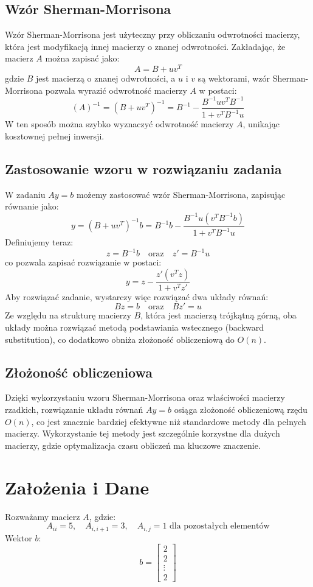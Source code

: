 \documentclass[a4paper,12pt]{article}
\begin{document}
\subsection{Wzór Sherman-Morrisona}
Wzór Sherman-Morrisona jest użyteczny przy obliczaniu odwrotności macierzy, która jest modyfikacją innej macierzy o znanej odwrotności. Zakładając, że macierz \( A \) można zapisać jako:
\[
A = B + uv^T
\]
gdzie \( B \) jest macierzą o znanej odwrotności, a \( u \) i \( v \) są wektorami, wzór Sherman-Morrisona pozwala wyrazić odwrotność macierzy \( A \) w postaci:
\[
(A)^{-1} = (B + uv^T)^{-1} = B^{-1} - \frac{B^{-1} u v^T B^{-1}}{1 + v^T B^{-1} u}
\]
W ten sposób można szybko wyznaczyć odwrotność macierzy \( A \), unikając kosztownej pełnej inwersji.

\subsection{Zastosowanie wzoru w rozwiązaniu zadania}
W zadaniu \( Ay = b \) możemy zastosować wzór Sherman-Morrisona, zapisując równanie jako:
\[
y = (B + uv^T)^{-1} b = B^{-1}b - \frac{B^{-1} u (v^T B^{-1} b)}{1 + v^T B^{-1} u}
\]
Definiujemy teraz:
\[
z = B^{-1} b \quad \text{oraz} \quad z' = B^{-1} u
\]
co pozwala zapisać rozwiązanie w postaci:
\[
y = z - \frac{z' (v^T z)}{1 + v^T z'}
\]
Aby rozwiązać zadanie, wystarczy więc rozwiązać dwa układy równań:
\[
B z = b \quad \text{oraz} \quad B z' = u
\]
Ze względu na strukturę macierzy \( B \), która jest macierzą trójkątną górną, oba układy można rozwiązać metodą podstawiania wstecznego (backward substitution), co dodatkowo obniża złożoność obliczeniową do \( O(n) \).

\subsection{Złożoność obliczeniowa}
Dzięki wykorzystaniu wzoru Sherman-Morrisona oraz właściwości macierzy rzadkich, rozwiązanie układu równań \( Ay = b \) osiąga złożoność obliczeniową rzędu \( O(n) \), co jest znacznie bardziej efektywne niż standardowe metody dla pełnych macierzy. Wykorzystanie tej metody jest szczególnie korzystne dla dużych macierzy, gdzie optymalizacja czasu obliczeń ma kluczowe znaczenie.



\section{Założenia i Dane}
Rozważamy macierz \( A \), gdzie:
\[
A_{ii} = 5, \quad A_{i, i+1} = 3, \quad A_{i, j} = 1 \text{ dla pozostałych elementów}
\]
Wektor \( b \):
\[
b = \begin{bmatrix} 2 \\ 2 \\ \vdots \\ 2 \end{bmatrix}
\]
\end{document}
